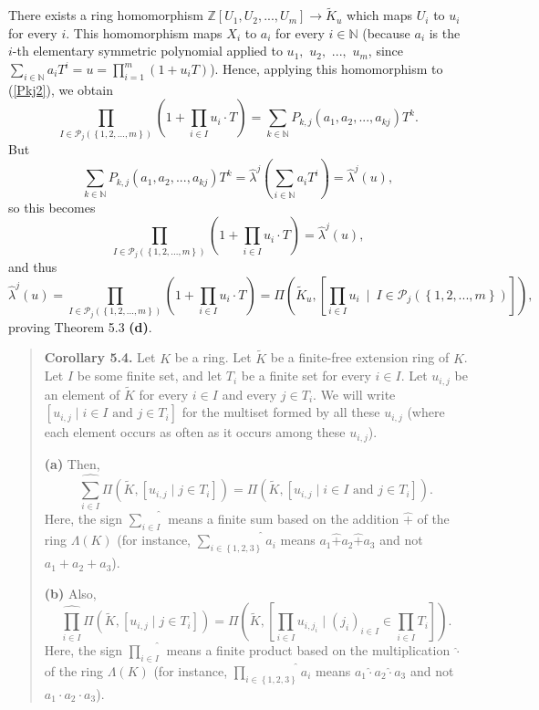 \documentclass[numbers=enddot,12pt,final,onecolumn,notitlepage]{scrartcl}%
\begin{document}
There exists a ring homomorphism $\mathbb{Z}\left[  U_{1},U_{2},...,U_{m}%
\right]  \rightarrow\widetilde{K}_{u}$ which maps $U_{i}$ to $u_{i}$ for every
$i$. This homomorphism maps $X_{i}$ to $a_{i}$ for every $i\in\mathbb{N}$
(because $a_{i}$ is the $i$-th elementary symmetric polynomial applied to
$u_{1},$ $u_{2},$ $...,$ $u_{m}$, since $\sum\limits_{i\in\mathbb{N}}%
a_{i}T^{i}=u=\prod\limits_{i=1}^{m}\left(  1+u_{i}T\right)  $). Hence,
applying this homomorphism to (\ref{Pkj2}), we obtain%
\[
\prod_{I\in\mathcal{P}_{j}\left(  \left\{  1,2,...,m\right\}  \right)
}\left(  1+\prod_{i\in I}u_{i}\cdot T\right)  =\sum_{k\in\mathbb{N}}%
P_{k,j}\left(  a_{1},a_{2},...,a_{kj}\right)  T^{k}.
\]
But%
\[
\sum_{k\in\mathbb{N}}P_{k,j}\left(  a_{1},a_{2},...,a_{kj}\right)
T^{k}=\widehat{\lambda}^{j}\left(  \sum_{i\in\mathbb{N}}a_{i}T^{i}\right)
=\widehat{\lambda}^{j}\left(  u\right)  ,
\]
so this becomes%
\[
\prod_{I\in\mathcal{P}_{j}\left(  \left\{  1,2,...,m\right\}  \right)
}\left(  1+\prod_{i\in I}u_{i}\cdot T\right)  =\widehat{\lambda}^{j}\left(
u\right)  ,
\]
and thus%
\[
\widehat{\lambda}^{j}\left(  u\right)  =\prod_{I\in\mathcal{P}_{j}\left(
\left\{  1,2,...,m\right\}  \right)  }\left(  1+\prod_{i\in I}u_{i}\cdot
T\right)  =\Pi\left(  \widetilde{K}_{u},\left[  \prod\limits_{i\in I}%
u_{i}\ \mid\ I\in\mathcal{P}_{j}\left(  \left\{  1,2,...,m\right\}  \right)
\right]  \right)  ,
\]
proving Theorem 5.3 \textbf{(d)}.

\begin{quote}
\textbf{Corollary 5.4.} Let $K$ be a ring. Let $\widetilde{K}$ be a
finite-free extension ring of $K$. Let $I$ be some finite set, and let $T_{i}$
be a finite set for every $i\in I$. Let $u_{i,j}$ be an element of
$\widetilde{K}$ for every $i\in I$ and every $j\in T_{i}$. We will write
$\left[  u_{i,j}\mid i\in I\text{ and }j\in T_{i}\right]  $ for the multiset
formed by all these $u_{i,j}$ (where each element occurs as often as it occurs
among these $u_{i,j}$).

\textbf{(a)} Then,%
\[
\widehat{\sum_{i\in I}}\Pi\left(  \widetilde{K},\left[  u_{i,j}\mid j\in
T_{i}\right]  \right)  =\Pi\left(  \widetilde{K},\left[  u_{i,j}\mid i\in
I\text{ and }j\in T_{i}\right]  \right)  .
\]
Here, the sign $\widehat{\sum\limits_{i\in I}}$ means a finite sum based on
the addition $\widehat{+}$ of the ring $\Lambda\left(  K\right)  $ (for
instance, $\widehat{\sum\limits_{i\in\left\{  1,2,3\right\}  }}a_{i}$ means
$a_{1}\widehat{+}a_{2}\widehat{+}a_{3}$ and not $a_{1}+a_{2}+a_{3}$).

\textbf{(b)} Also,%
\[
\widehat{\prod_{i\in I}}\Pi\left(  \widetilde{K},\left[  u_{i,j}\mid j\in
T_{i}\right]  \right)  =\Pi\left(  \widetilde{K},\left[  \prod_{i\in
I}u_{i,j_{i}}\mid\left(  j_{i}\right)  _{i\in I}\in\prod_{i\in I}T_{i}\right]
\right)  .
\]
Here, the sign $\widehat{\prod\limits_{i\in I}}$ means a finite product based
on the multiplication $\widehat{\cdot}$ of the ring $\Lambda\left(  K\right)
$ (for instance, $\widehat{\prod\limits_{i\in\left\{  1,2,3\right\}  }}a_{i}$
means $a_{1}\widehat{\cdot}a_{2}\widehat{\cdot}a_{3}$ and not $a_{1}\cdot
a_{2}\cdot a_{3}$).
\end{quote}
\end{document}
